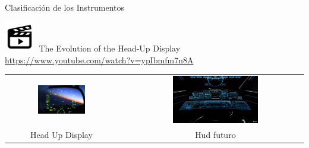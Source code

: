 \begin{frame}{Clasificaci\'on de los Instrumentos}

{\includegraphics[width=0.1\textwidth]{imagenes/Video.png}}\,
The Evolution of the Head-Up Display \url{https://www.youtube.com/watch?v=ypIbmfm7n8A}
\vspace{3mm}

  \begin{tabular}{ccc}
    \includegraphics[width=0.45\textwidth]{imagenes/1.2.clasificacion.instrumentos/hud.jpg} & \hspace{3mm}
&     \includegraphics[width=0.5\textwidth]{imagenes/1.2.clasificacion.instrumentos/viper_11.png}
\\
\parbox{0.45\textwidth}{Head Up Display}
&
& Hud futuro
\\
  \end{tabular}

\end{frame}

